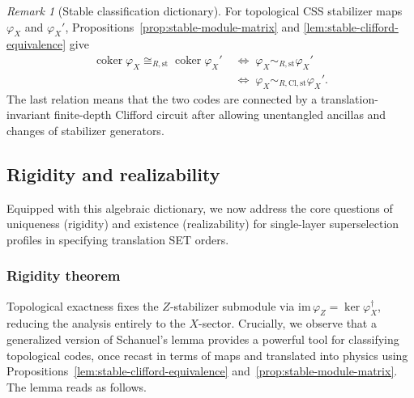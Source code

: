 \documentclass[aps,prx,english,superscriptaddress,twocolumn,tightenlines,showpacs,longbibliography,floatfix,amsfonts]{revtex4-2}
\theoremstyle{remark}
\newtheorem{remark}{Remark}
\theoremstyle{definition}
\begin{document}
\begin{remark}[Stable classification dictionary]
	\label{rem:physical-dictionary-modules}
	For topological CSS stabilizer maps $\varphi_X$ and $\varphi_X'$,
	Propositions~\ref{prop:stable-module-matrix} and
	\ref{lem:stable-clifford-equivalence} give
	\begin{equation*}
		\begin{aligned}
			\operatorname{coker}\varphi_X
			\cong_{R,\mathrm{st}}
			\operatorname{coker}\varphi_X'
			&\;\Longleftrightarrow\;
			\varphi_X\sim_{R,\mathrm{st}}\varphi_X'\\
			&\;\Longleftrightarrow\;
			\varphi_X\sim_{R,\mathrm{Cl},\mathrm{st}}\varphi_X'.
		\end{aligned}
	\end{equation*}
	The last relation means that the two codes are connected by a
	translation-invariant finite-depth Clifford circuit after allowing
	unentangled ancillas and changes of stabilizer generators.
\end{remark}

\subsection{Rigidity and realizability}

Equipped with this algebraic dictionary, we now address the core questions of uniqueness (rigidity) and existence (realizability) for single-layer superselection profiles in specifying translation SET orders.

\subsubsection{Rigidity theorem}

Topological exactness fixes the $Z$-stabilizer submodule via $\mathrm{im}\,\varphi_Z = \ker\varphi_X^\dagger$, reducing the analysis entirely to the $X$-sector. Crucially, we observe that a generalized version of Schanuel's lemma provides a powerful tool for classifying topological codes, once recast in terms of maps and translated into physics using Propositions~\ref{lem:stable-clifford-equivalence} and~\ref{prop:stable-module-matrix}. The lemma reads as follows.
\end{document}
